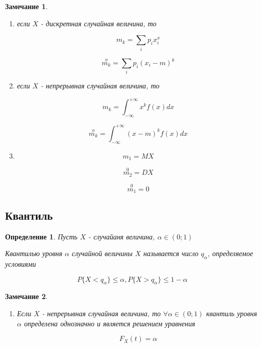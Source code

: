 \documentclass[a4paper, 14pt]{report}
\newtheorem{defenition}{Определение}[section]
\newtheorem{note}{Замечание}[section]
\begin{document}
\begin{note}
    \begin{enumerate}
        \item если $X$ - дискретная случайная величина, то

            $$
            m_k = \sum_i p_ix_i^x
            $$

            $$
            \overset{o}{m_k} = \sum_i p_i(x_i-m)^k
            $$

        \item если $X$ - непрерывная случайная величина, то

            $$
            m_k = \int_{-\infty}^{+\infty} x^k f(x) dx
            $$

            $$
            \overset{o}{m_k} = \int_{-\infty}^{+\infty} (x-m)^k f(x) dx
            $$

        \item

            $$
            m_1 = MX
            $$

            $$
            \overset{0}{m_2} = DX
            $$

            $$
            \overset{0}{m_1} = 0
            $$
    \end{enumerate}
\end{note}

\subsection{Квантиль}

\begin{defenition}
    Пусть $X$ - случайаня величина, $\alpha \in (0;1)$

    Квантилью уровня $\alpha$ случайной величины $X$ называется число $q_\alpha$, определяемое условиями

    $$
    P\{X<q_\alpha\} \le \alpha, P\{ X > q_\alpha \} \le 1 - \alpha
    $$
\end{defenition}

\begin{note}
    \begin{enumerate}
    \item Если $X$ - непрерывная случайная величина, то $\forall \alpha \in (0;1)$ квантиль уровня $\alpha$ определена однозначно и является решением уравнения

        $$
        F_X(t) = \alpha
        $$
    \end{enumerate}
\end{note}
\end{document}
